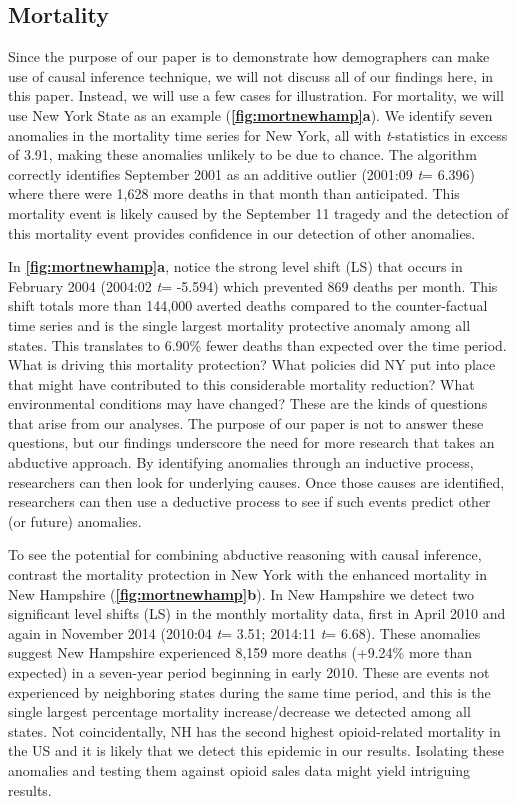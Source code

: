 \documentclass[12pt]{article}
\begin{document}
\hypertarget{mortality}{%
\subsection{Mortality}\label{mortality}}

Since the purpose of our paper is to demonstrate how demographers can
make use of causal inference technique, we will not discuss all of our
findings here, in this paper. Instead, we will use a few cases for
illustration. For mortality, we will use New York State as an example
(\textbf{\autoref{fig:mortnewhamp}a}). We identify seven anomalies in
the mortality time series for New York, all with \emph{t}-statistics in
excess of 3.91, making these anomalies unlikely to be due to chance. The
algorithm correctly identifies September 2001 as an additive outlier
(2001:09 \emph{t}= 6.396) where there were 1,628 more deaths in that
month than anticipated. This mortality event is likely caused by the
September 11 tragedy and the detection of this mortality event provides
confidence in our detection of other anomalies.

In \textbf{\autoref{fig:mortnewhamp}a}, notice the strong level shift
(LS) that occurs in February 2004 (2004:02 \emph{t}= -5.594) which
prevented 869 deaths per month. This shift totals more than 144,000
averted deaths compared to the counter-factual time series and is the
single largest mortality protective anomaly among all states. This
translates to 6.90\% fewer deaths than expected over the time period.
What is driving this mortality protection? What policies did NY put into
place that might have contributed to this considerable mortality
reduction? What environmental conditions may have changed? These are the
kinds of questions that arise from our analyses. The purpose of our
paper is not to answer these questions, but our findings underscore the
need for more research that takes an abductive approach. By identifying
anomalies through an inductive process, researchers can then look for
underlying causes. Once those causes are identified, researchers can
then use a deductive process to see if such events predict other (or
future) anomalies.

To see the potential for combining abductive reasoning with causal
inference, contrast the mortality protection in New York with the
enhanced mortality in New Hampshire
(\textbf{\autoref{fig:mortnewhamp}b}). In New Hampshire we detect two
significant level shifts (LS) in the monthly mortality data, first in
April 2010 and again in November 2014 (2010:04 \emph{t}= 3.51; 2014:11
\emph{t}= 6.68). These anomalies suggest New Hampshire experienced 8,159
more deaths (+9.24\% more than expected) in a seven-year period
beginning in early 2010. These are events not experienced by neighboring
states during the same time period, and this is the single largest
percentage mortality increase/decrease we detected among all states. Not
coincidentally, NH has the second highest opioid-related mortality in
the US \citep{beetham2019access} and it is likely that we detect this
epidemic in our results. Isolating these anomalies and testing them
against opioid sales data might yield intriguing results.
\end{document}
